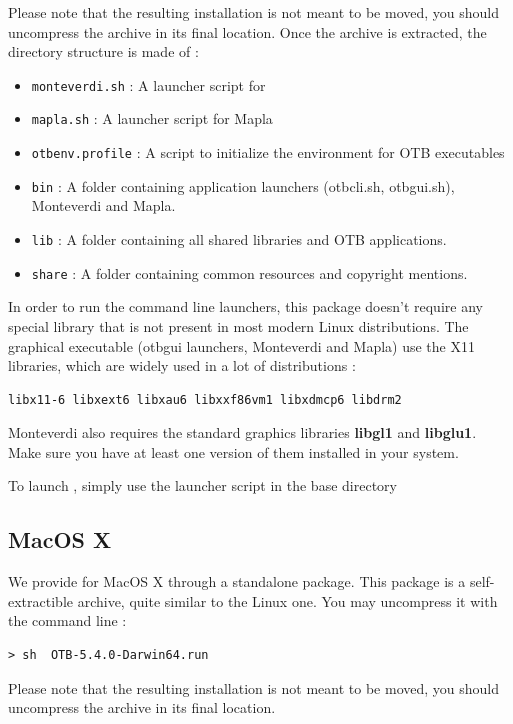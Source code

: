 Please note that the resulting installation is not meant to be moved, you should
uncompress the archive in its final location. Once the archive is extracted, 
the directory structure is made of :
\begin{itemize}
\item \verb?monteverdi.sh? : A launcher script for \mont
\item \verb?mapla.sh? : A launcher script for Mapla
\item \verb?otbenv.profile? : A script to initialize the environment for OTB executables
\item \verb?bin? : A folder containing application launchers (otbcli\textunderscore *.sh,
otbgui\textunderscore *.sh), Monteverdi and Mapla.
\item \verb?lib? : A folder containing all shared libraries and OTB applications.
\item \verb?share? : A folder containing common resources and copyright mentions.
\end{itemize}

In order to run the command line launchers, this package doesn't require any special
library that is not present in most modern Linux distributions. The graphical
executable (otbgui launchers, Monteverdi and Mapla) use the X11 libraries, which
are widely used in a lot of distributions :
\begin{verbatim}
libx11-6 libxext6 libxau6 libxxf86vm1 libxdmcp6 libdrm2
\end{verbatim}
Monteverdi also requires the standard graphics libraries \textbf{libgl1} and
\textbf{libglu1}. Make sure you have at least one version of them installed in
your system.

To launch \mont, simply use the launcher script in the base directory

\subsection{MacOS X}

We provide \mont for MacOS X through a standalone package. This package is a 
self-extractible archive, quite similar to the Linux one. You may uncompress 
it with the command line :
\begin{verbatim}
> sh  OTB-5.4.0-Darwin64.run
\end{verbatim}

Please note that the resulting installation is not meant to be moved, you should
uncompress the archive in its final location.

